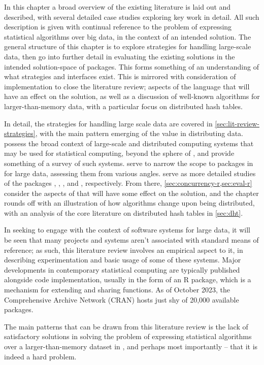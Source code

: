 In this chapter a broad overview of the existing literature is laid out and described, with several detailed case studies exploring key work in detail.
All such description is given with continual reference to the problem of expressing statistical algorithms over big data, in the context of an intended \lsr{} solution.
The general structure of this chapter is to explore strategies for handling large-scale data, then go into further detail in evaluating the existing solutions in the intended solution-space of \R{} packages.
This forms something of an understanding of what strategies and interfaces exist.
This is mirrored with consideration of implementation to close the literature review; aspects of the \R{} language that will have an effect on the solution, as well as a discussion of well-known algorithms for larger-than-memory data, with a particular focus on distributed hash tables.

In detail, the strategies for handling large scale data are covered in \cref{sec:lit-review-strategies}, with the main pattern emerging of the value in distributing data.
 possess the broad context of large-scale and distributed computing systems that may be used for statistical computing, beyond the sphere of \R{}, and provide something of a survey of such systems.
 serve to narrow the scope to packages in \R{} for large data, assessing them from various angles.
 serve as more detailed studies of the \R{} packages , , , and , respectively.
From there, \cref{sec:concurrency-r,sec:eval-r} consider the aspects of \R{} that will have some effect on the solution, and the chapter rounds off with an illustration of how algorithms change upon being distributed, with an analysis of the core literature on distributed hash tables in \cref{sec:dht}.

In seeking to engage with the context of software systems for large data, it will be seen that many projects and systems aren't associated with standard means of reference; as such, this literature review involves an empirical aspect to it, in describing experimentation and basic usage of some of these systems.
Major developments in contemporary statistical computing are typically published alongside \R{} code implementation, usually in the form of an R package, which is a mechanism for extending \R{} and sharing functions.
As of October 2023, the Comprehensive \R{} Archive Network (CRAN) hosts just shy of 20,000 available packages\cite{team20:_r}.

The main patterns that can be drawn from this literature review is the lack of satisfactory solutions in solving the problem of expressing statistical algorithms over a larger-than-memory dataset in \R{}, and perhaps most importantly -- that it is indeed a hard problem.
